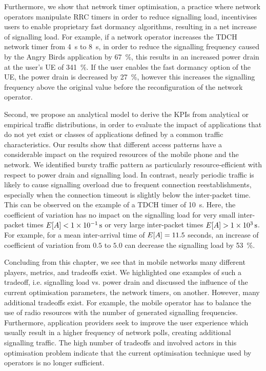 Furthermore, we show that network timer optimisation, a practice where network operators manipulate \gls{RRC} timers in order to reduce signalling load, incentivises users to enable proprietary fast dormancy algorithms, resulting in a net increase of signalling load.
For example, if a network operator increases the \gls{TDCH} network timer from \SI{4}{\second} to \SI{8}{\second}, in order to reduce the signalling frequency caused by the Angry Birds application by \SI{67}{\percent}, this results in an increased power drain at the user's \gls{UE} of \SI{341}{\percent}.
If the user enables the fast dormancy option of the \gls{UE}, the power drain is decreased by \SI{27}{\percent}, however this increases the signalling frequency above the original value before the reconfiguration of the network operator.

Second, we propose an analytical model to derive the \glspl{KPI} from analytical or empirical traffic distributions, in order to evaluate the impact of applications that do not yet exist or classes of applications defined by a common traffic characteristics.
Our results show that different access patterns have a considerable impact on the required resources of the mobile phone and the network.
We identified bursty traffic pattern as particularly resource-efficient with respect to power drain and signalling load.
In contrast, nearly periodic traffic is likely to cause signalling overload due to frequent connection reestablishments, especially when the connection timeout is slightly below the inter-packet time.
This can be observed on the example of a \gls{TDCH} timer of \SI{10}{\second}.
Here, the coefficient of variation has no impact on the signalling load for very small inter-packet times \(E[A]<\SI{1e-1}{\second}\) or very large inter-packet times \(E[A]>\SI{1e3}{\second}\).
For example, for a mean inter-arrival time of \(E[A] = 11.5\) seconds, an increase of coefficient of variation from \(0.5\) to \(5.0\) can decrease the signalling load by \SI{53}{\percent}.

Concluding from this chapter, we see that in mobile networks many different players, metrics, and tradeoffs exist.
We highlighted one examples of such a tradeoff, i.e. signalling load vs. power drain and discussed the influence of the current optimisation parameters, the network timers, on another.
However, many additional tradeoffs exist.
For example, the mobile operator has to balance the use of radio resources with the number of generated signalling frequencies.
Furthermore, application providers seek to improve the user experience which usually result in a higher frequency of network polls, creating additional signalling traffic.
The high number of tradeoffs and involved actors in this optimisation problem indicate that the current optimisation technique used by operators is no longer sufficient.


